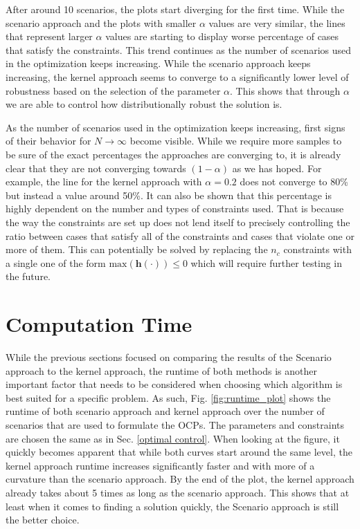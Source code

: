 After around 10 scenarios, the plots start diverging for the first time. While the scenario approach and the plots with smaller $\alpha$ values are very similar, the lines that represent larger $\alpha$ values are starting to display worse percentage of cases that satisfy the constraints. This trend continues as the number of scenarios used in the optimization keeps increasing. While the scenario approach keeps increasing, the kernel approach seems to converge to a significantly lower level of robustness based on the selection of the parameter $\alpha$. This shows that through $\alpha$ we are able to control how distributionally robust the solution is.

As the number of scenarios used in the optimization keeps increasing, first signs of their behavior for $N \to \infty$ become visible. While we require more samples to be sure of the exact percentages the approaches are converging to, it is already clear that they are not converging towards $(1 - \alpha)$ as we has hoped. For example, the line for the kernel approach with $\alpha = 0.2$ does not converge to 80\% but instead a value around 50\%. It can also be shown that this percentage is highly dependent on the number and types of constraints used. That is because the way the constraints are set up does not lend itself to precisely controlling the ratio between cases that satisfy all of the constraints and cases that violate one or more of them. This can potentially be solved by replacing the $n_c$ constraints with a single one of the form $\text{max}(\boldsymbol{h}(\cdot)) \leq 0$ which will require further testing in the future.
 
\iffalse
\section{Computation Time} \label{computation time}

While the previous sections focused on comparing the results of the Scenario approach to the kernel approach, the runtime of both methods is another important factor that needs to be considered when choosing which algorithm is best suited for a specific problem. As such, Fig. \ref{fig:runtime_plot} shows the runtime of both scenario approach and kernel approach over the number of scenarios that are used to formulate the OCPs. The parameters and constraints are chosen the same as in Sec. \ref{optimal control}. When looking at the figure, it quickly becomes apparent that while both curves start around the same level, the kernel approach runtime increases significantly faster and with more of a curvature than the scenario approach. By the end of the plot, the kernel approach already takes about 5 times as long as the scenario approach. This shows that at least when it comes to finding a solution quickly, the Scenario approach is still the better choice.

